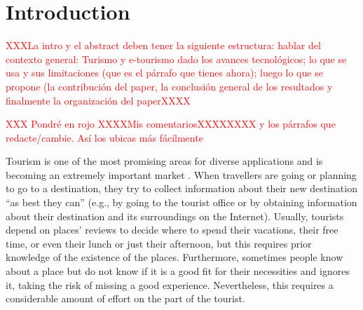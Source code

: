 \section{Introduction}
\textcolor{red}{XXXLa intro y el abstract deben tener la siguiente estructura: hablar del contexto general: Turismo y e-tourismo dado los avances tecnológicos; lo que se usa y sus limitaciones (que es el párrafo que tienes ahora); luego lo que se propone (la contribución del paper, la conclusión general de los resultados y finalmente la organización del paperXXXX}

\textcolor{red}{XXX Pondré en rojo XXXXMis comentariosXXXXXXXX y los párrafos que redacte/cambie. Así los ubicas más fácilmente}


Tourism is one of the most promising areas for diverse applications and is becoming an extremely
important market \cite{buhalis2011tourism,murphy2013tourism,fermoso2015open,ku2015cultivating,alghamdi2016tourism,artemenko2017tourism,kazandzhieva2019tourism}. 
When travellers are going or planning to go to a destination, they try to collect information about their new destination “as best they can” (e.g., by going to the tourist office or by obtaining information about their destination and its surroundings on the Internet). Usually, tourists depend on places' reviews to decide where to spend their vacations, their free time, or even their lunch or just their afternoon, but this requires prior knowledge of the existence of the places. Furthermore, sometimes people know about a place but do not know if it is a good fit for their necessities and ignores it, taking the risk of missing a good experience. Nevertheless, this requires a considerable amount of effort on the part of the tourist.




